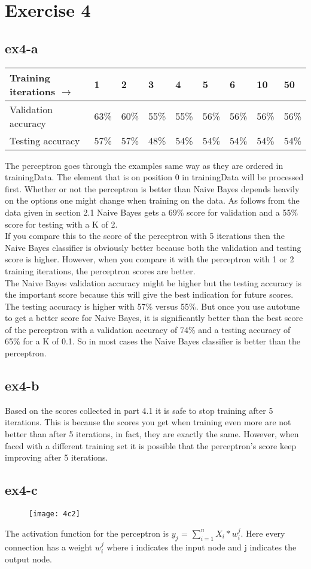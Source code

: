 \section{Exercise 4}
\subsection{ex4-a}
\begin{table}[!htbp]
\begin{tabular}{|l||l|l|l|l|l|l|l|l|}
\hline
Training iterations $\rightarrow$  & 1   & 2 & 3 & 4 & 5 & 6 & 10 & 50 \\ \hline
Validation accuracy  & 63\% & 60\% & 55\% & 55\% & 56\% & 56\% & 56\% & 56\% \\ 
Testing accuracy    & 57\% & 57\% & 48\% & 54\% & 54\% & 54\% & 54\% & 54\% \\ \hline
\end{tabular}
\end{table}
The perceptron goes through the examples same way as they are ordered in trainingData. 
The element that is on position 0 in trainingData will be processed first.
Whether or not the perceptron is better than Naive Bayes depends heavily on the options 
one might change when training on the data. As follows from the data given in section 2.1 
Naive Bayes gets a 69\% score for validation and a 55\% score for testing with a K of 2. \\
If you compare this to the score of the perceptron with 5 iterations then the Naive Bayes 
classifier is obviously better because both the validation and testing score is higher.
However, when you compare it with the perceptron with 1 or 2 training iterations, the perceptron
scores are better. \\
The Naive Bayes validation accuracy might be higher but the testing accuracy
is the important score because this will give the best indication for future scores. 
The testing accuracy is higher with 57\% versus 55\%.
But once you use autotune to get a better score for Naive Bayes, it is significantly better
than the best score of the perceptron with a validation accuracy of 74\% and a testing accuracy 
of 65\% for a K of 0.1. So in most cases the Naive Bayes classifier is better than the perceptron.

\subsection{ex4-b}
Based on the scores collected in part 4.1 it is safe to stop training after 5 iterations. 
This is because the scores you get when training even more are not better than after 5 iterations, 
in fact, they are exactly the same. However, when faced with a different training set it is 
possible that the perceptron's score keep improving after 5 iterations.

\subsection{ex4-c}
\begin{figure}[H]
\caption{}
\centering
\texttt{[image: 4c2]}
\end{figure}
The activation function for the perceptron is $y_j$ = $\sum_{i=1}^{n} X_i * w_i^j$. Here every 
connection has a weight $w_i^j$ where i indicates the input node and j indicates the output node.
